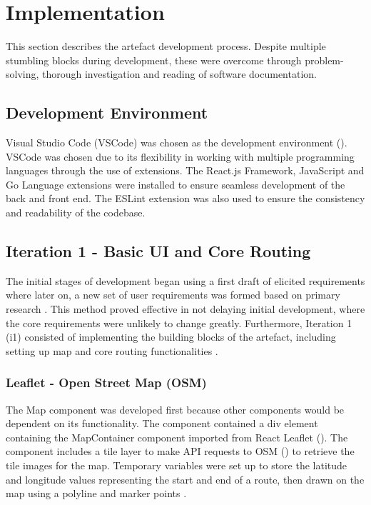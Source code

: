 \chapter{Implementation}
\label{chap:implementation}

This section describes the artefact development process. Despite multiple stumbling blocks during development, these were overcome through problem-solving, thorough investigation and reading of software documentation.  

\section{Development Environment}
\label{implementation:de}

Visual Studio Code (VSCode) was chosen as the development environment (\cite{noauthor_visual_nodate}). VSCode was chosen due to its flexibility in working with multiple programming languages through the use of extensions. The React.js Framework, JavaScript and Go Language extensions were installed to ensure seamless development of the back and front end. The ESLint extension was also used to ensure the consistency and readability of the codebase.

\section{Iteration 1 - Basic UI and Core Routing}
\label{implementation:iteration1}
The initial stages of development began using a first draft of elicited requirements  where later on, a new set of user requirements was formed based on primary research . This method proved effective in not delaying initial development, where the core requirements were unlikely to change greatly. Furthermore, Iteration 1 (i1) consisted of implementing the building blocks of the artefact, including setting up map  and core routing functionalities .

\subsection{Leaflet - Open Street Map (OSM)}
\label{iteration1:leaflet-osm}
The Map component was developed first because other components would be dependent on its functionality. The component contained a div element containing the MapContainer component imported from React Leaflet (\cite{noauthor_react_nodate}). The component includes a tile layer to make API requests to OSM (\cite{noauthor_openstreetmap_nodate}) to retrieve the tile images for the map. Temporary variables were set up to store the latitude and longitude values representing the start and end of a route, then drawn on the map using a polyline and marker points . 

